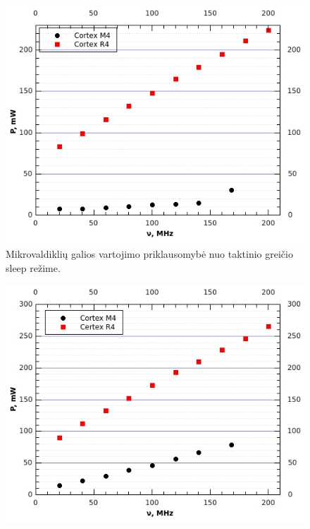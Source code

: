 \documentclass[a4paper, 12pt]{article} %
\begin{document}
\begin{onehalfspacing}
\begin{figure}[H]
\includegraphics[scale=0.8]{pav/sleep.jpg} %
\captionsetup{labelformat=numbfirst} %
\captionsetup{labelseparator=tarpas}
\caption{Mikrovaldikli\k{u} galios vartojimo priklausomyb\.e nuo taktinio grei\v{c}io sleep re\v{z}ime.}
\label{vienas}
\end{figure}
\begin{figure}[H] %
\centering %
\includegraphics[scale=0.8]{pav/tuscias.jpg} %

\end{figure}
\end{onehalfspacing}
\end{document}
